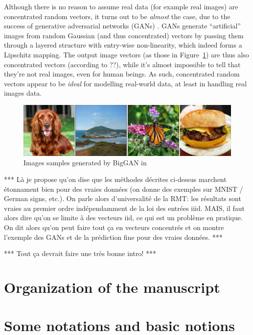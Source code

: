 \documentclass[MAL,biber]{nowfnt} %
\newcommand{\RED}{\color[rgb]{0.70,0,0}}
\begin{document}
Although there is no reason to assume real data (for example real images) are concentrated random vectors, it turns out to be \emph{almost} the case, due to the success of generative adversarial networks (GANs) \citep{goodfellow2014generative,brock2018large}. GANs generate ``artificial'' images from random Gaussian (and thus concentrated) vectors by passing them through a layered structure with entry-wise non-linearity, which indeed forms a Lipschitz mapping. The output image vectors (as those in Figure~\ref{fig:biggan}) are thus also concentrated vectors (according to ??), while it’s almost impossible to tell that they’re not real images, even for human beings. As such, concentrated random vectors appear to be \emph{ideal} for modelling real-world data, at least in handling real images data.


\begin{figure}[htb]
    \centering
    \includegraphics[width=.85\linewidth]{BigGan.jpg}
    \caption{Images samples generated by BigGAN in \citep{brock2018large}}
    \label{fig:biggan}
\end{figure}

{\RED 
*** Là je propose qu'on dise que les méthodes décrites ci-dessus marchent étonnament bien pour des vraies données (on donne des exemples sur MNIST / German signs, etc.). On parle alors d'universalité de la RMT: les résultats sont vraies au premier ordre indépendamment de la loi des entrées iiid. MAIS, il faut alors dire qu'on se limite à des vecteurs iid, ce qui est un problème en pratique. On dit alors qu'on peut faire tout ça en vecteurs concentrés et on montre l'exemple des GANs et de la prédiction fine pour des vraies données. ***

*** Tout ça devrait faire une très bonne intro! ***

}


\section{Organization of the manuscript}
\label{sec:organization}

{\RED 

\section{Some notations and basic notions}

}
\end{document}
